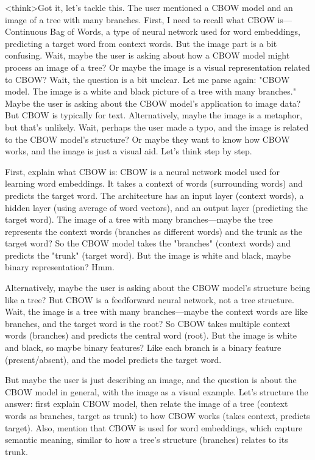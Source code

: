 <think>Got it, let's tackle this. The user mentioned a CBOW model and an image of a tree with many branches. First, I need to recall what CBOW is—Continuous Bag of Words, a type of neural network used for word embeddings, predicting a target word from context words. But the image part is a bit confusing. Wait, maybe the user is asking about how a CBOW model might process an image of a tree? Or maybe the image is a visual representation related to CBOW? Wait, the question is a bit unclear. Let me parse again: "CBOW model. The image is a white and black picture of a tree with many branches." Maybe the user is asking about the CBOW model's application to image data? But CBOW is typically for text. Alternatively, maybe the image is a metaphor, but that's unlikely. Wait, perhaps the user made a typo, and the image is related to the CBOW model's structure? Or maybe they want to know how CBOW works, and the image is just a visual aid. Let's think step by step.

First, explain what CBOW is: CBOW is a neural network model used for learning word embeddings. It takes a context of words (surrounding words) and predicts the target word. The architecture has an input layer (context words), a hidden layer (using average of word vectors), and an output layer (predicting the target word). The image of a tree with many branches—maybe the tree represents the context words (branches as different words) and the trunk as the target word? So the CBOW model takes the "branches" (context words) and predicts the "trunk" (target word). But the image is white and black, maybe binary representation? Hmm.

Alternatively, maybe the user is asking about the CBOW model's structure being like a tree? But CBOW is a feedforward neural network, not a tree structure. Wait, the image is a tree with many branches—maybe the context words are like branches, and the target word is the root? So CBOW takes multiple context words (branches) and predicts the central word (root). But the image is white and black, so maybe binary features? Like each branch is a binary feature (present/absent), and the model predicts the target word.

But maybe the user is just describing an image, and the question is about the CBOW model in general, with the image as a visual example. Let's structure the answer: first explain CBOW model, then relate the image of a tree (context words as branches, target as trunk) to how CBOW works (takes context, predicts target). Also, mention that CBOW is used for word embeddings, which capture semantic meaning, similar to how a tree's structure (branches) relates to its trunk.

